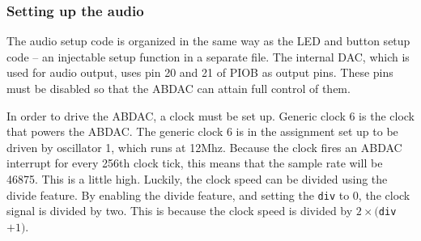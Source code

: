 \subsubsection{Setting up the audio}

The audio setup code is organized in the same way as the LED and button setup code -- an injectable setup function in a separate file.
The internal DAC, which is used for audio output, uses pin 20 and 21 of PIOB as output pins.
These pins must be disabled so that the ABDAC can attain full control of them.

In order to drive the ABDAC, a clock must be set up.
Generic clock 6 is the clock that powers the ABDAC.
The generic clock 6 is in the assignment set up to be driven by oscillator 1, which runs at 12Mhz.
Because the clock fires an ABDAC interrupt for every 256th clock tick, this means that the sample rate will be 46875.
This is a little high.
Luckily, the clock speed can be divided using the divide feature.
By enabling the divide feature, and setting the \texttt{div} to 0, the clock signal is divided by two.
This is because the clock speed is divided by $2\times($\texttt{div}$+1)$.

